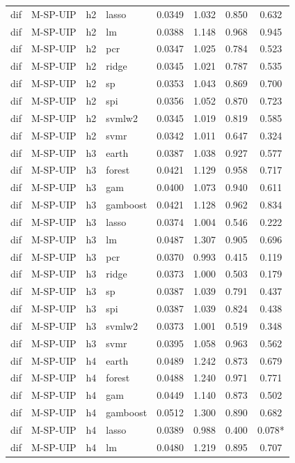 \begin{ThreePartTable}
\begin{longtable}[t]{llclcccc}
dif & M-SP-UIP & h2 & lasso & 0.0349 & 1.032 & 0.850 & 0.632\\
dif & M-SP-UIP & h2 & lm & 0.0388 & 1.148 & 0.968 & 0.945\\
dif & M-SP-UIP & h2 & pcr & 0.0347 & 1.025 & 0.784 & 0.523\\
dif & M-SP-UIP & h2 & ridge & 0.0345 & 1.021 & 0.787 & 0.535\\
dif & M-SP-UIP & h2 & sp & 0.0353 & 1.043 & 0.869 & 0.700\\
dif & M-SP-UIP & h2 & spi & 0.0356 & 1.052 & 0.870 & 0.723\\
dif & M-SP-UIP & h2 & svmlw2 & 0.0345 & 1.019 & 0.819 & 0.585\\
dif & M-SP-UIP & h2 & svmr & 0.0342 & 1.011 & 0.647 & 0.324\\
\addlinespace
dif & M-SP-UIP & h3 & earth & 0.0387 & 1.038 & 0.927 & 0.577\\
dif & M-SP-UIP & h3 & forest & 0.0421 & 1.129 & 0.958 & 0.717\\
dif & M-SP-UIP & h3 & gam & 0.0400 & 1.073 & 0.940 & 0.611\\
dif & M-SP-UIP & h3 & gamboost & 0.0421 & 1.128 & 0.962 & 0.834\\
dif & M-SP-UIP & h3 & lasso & 0.0374 & 1.004 & 0.546 & 0.222\\
dif & M-SP-UIP & h3 & lm & 0.0487 & 1.307 & 0.905 & 0.696\\
dif & M-SP-UIP & h3 & pcr & 0.0370 & 0.993 & 0.415 & 0.119\\
dif & M-SP-UIP & h3 & ridge & 0.0373 & 1.000 & 0.503 & 0.179\\
dif & M-SP-UIP & h3 & sp & 0.0387 & 1.039 & 0.791 & 0.437\\
dif & M-SP-UIP & h3 & spi & 0.0387 & 1.039 & 0.824 & 0.438\\
dif & M-SP-UIP & h3 & svmlw2 & 0.0373 & 1.001 & 0.519 & 0.348\\
dif & M-SP-UIP & h3 & svmr & 0.0395 & 1.058 & 0.963 & 0.562\\
\addlinespace
dif & M-SP-UIP & h4 & earth & 0.0489 & 1.242 & 0.873 & 0.679\\
dif & M-SP-UIP & h4 & forest & 0.0488 & 1.240 & 0.971 & 0.771\\
dif & M-SP-UIP & h4 & gam & 0.0449 & 1.140 & 0.873 & 0.502\\
dif & M-SP-UIP & h4 & gamboost & 0.0512 & 1.300 & 0.890 & 0.682\\
dif & M-SP-UIP & h4 & lasso & 0.0389 & 0.988 & 0.400 & 0.078*\\
dif & M-SP-UIP & h4 & lm & 0.0480 & 1.219 & 0.895 & 0.707\\

\end{longtable}
\end{ThreePartTable}
